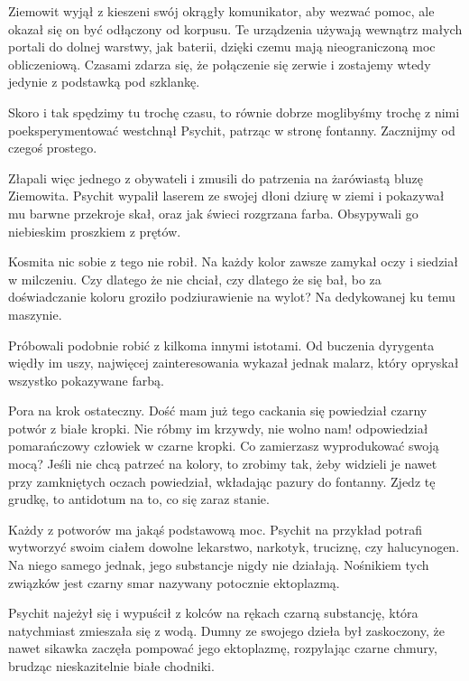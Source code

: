 Ziemowit wyjął z kieszeni swój okrągły komunikator, aby wezwać pomoc, ale okazał się on być odłączony od korpusu.
Te urządzenia używają wewnątrz małych portali do dolnej warstwy, jak baterii, dzięki czemu mają nieograniczoną moc obliczeniową.
Czasami zdarza się, że połączenie się zerwie i zostajemy wtedy jedynie z podstawką pod szklankę.

\divider{}

\begin{dialogue}
\ds{} Skoro i tak spędzimy tu trochę czasu, to równie dobrze moglibyśmy trochę z nimi poeksperymentować \dm{} westchnął Psychit, patrząc w stronę fontanny. \dm{}
Zacznijmy od czegoś prostego.
\end{dialogue}

Złapali więc jednego z obywateli i zmusili do patrzenia na żarówiastą bluzę Ziemowita.
Psychit wypalił laserem ze swojej dłoni dziurę w ziemi i pokazywał mu barwne przekroje skał, oraz jak świeci rozgrzana farba.
Obsypywali go niebieskim proszkiem z prętów.

Kosmita nic sobie z tego nie robił. 
Na każdy kolor zawsze zamykał oczy i siedział w milczeniu.
Czy dlatego że nie chciał, czy dlatego że się bał, bo za doświadczanie koloru groziło podziurawienie na wylot? Na dedykowanej ku temu maszynie.

Próbowali podobnie robić z kilkoma innymi istotami.
Od buczenia dyrygenta więdły im uszy, najwięcej zainteresowania wykazał jednak malarz, który opryskał wszystko pokazywane farbą.

\begin{dialogue}
\ds{} Pora na krok ostateczny. Dość mam już tego cackania się \dm{} powiedział czarny potwór z białe kropki.
\ds{} Nie róbmy im krzywdy, nie wolno nam! \dm{} odpowiedział pomarańczowy człowiek w czarne kropki. \dm{} Co zamierzasz wyprodukować swoją mocą?
\ds{} Jeśli nie chcą patrzeć na kolory, to zrobimy tak, żeby widzieli je nawet przy zamkniętych oczach \dm{} powiedział, wkładając pazury do fontanny. \dm{}
Zjedz tę grudkę, to antidotum na to, co się zaraz stanie.
\end{dialogue}

Każdy z potworów ma jakąś podstawową moc. Psychit na przykład potrafi wytworzyć swoim ciałem dowolne lekarstwo, narkotyk, truciznę, czy halucynogen. 
Na niego samego jednak, jego substancje nigdy nie działają.
Nośnikiem tych związków jest czarny smar nazywany potocznie ektoplazmą.

Psychit najeżył się i wypuścił z kolców na rękach czarną substancję, która natychmiast zmieszała się z wodą.
Dumny ze swojego dzieła był zaskoczony, że nawet sikawka zaczęła pompować jego ektoplazmę, rozpylając czarne chmury, brudząc nieskazitelnie białe chodniki.

